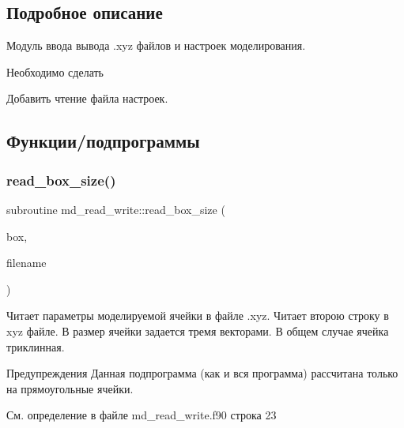 \subsection{Подробное описание}
Модуль ввода вывода .xyz файлов и настроек моделирования. 

\begin{DoxyRefDesc}{Необходимо сделать}
\item[\mbox{\hyperlink{todo__todo000002}{Необходимо сделать}}]Добавить чтение файла настроек. \end{DoxyRefDesc}


\subsection{Функции/подпрограммы}
\mbox{\label{namespacemd__read__write_ace09a29b4fd526f8ed784c90098279c4}} 
\subsubsection{\texorpdfstring{read\+\_\+box\+\_\+size()}{read\_box\_size()}}
{\footnotesize\ttfamily subroutine md\+\_\+read\+\_\+write\+::read\+\_\+box\+\_\+size (\begin{DoxyParamCaption}\item[{type(\mbox{\hyperlink{structmd__general_1_1simulation__cell}{simulation\+\_\+cell}})}]{box,  }\item[{character($\ast$)}]{filename }\end{DoxyParamCaption})}



Читает параметры моделируемой ячейки в файле .xyz.  Читает второю строку в xyz файле. В размер ячейки задается тремя векторами. В общем случае ячейка триклинная. 

\begin{DoxyWarning}{Предупреждения}
Данная подпрограмма (как и вся программа) рассчитана только на прямоугольные ячейки. 
\end{DoxyWarning}


См. определение в файле md\+\_\+read\+\_\+write.\+f90 строка 23


